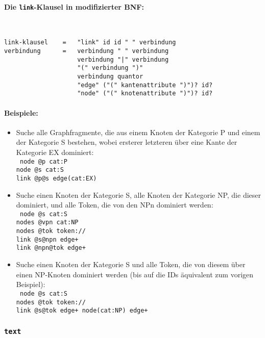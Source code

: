 \documentclass[12pt]{scrartcl}
\begin{document}
\paragraph*{Die \texttt{link}-Klausel in modifizierter BNF:}
~
\begin{framed}
\begin{lstlisting}
link-klausel    =   "link" id id " " verbindung
verbindung      =   verbindung " " verbindung
                    verbindung "|" verbindung
                    "(" verbindung ")"
                    verbindung quantor
                    "edge" ("(" kantenattribute ")")? id?
                    "node" ("(" knotenattribute ")")? id?
\end{lstlisting}
\end{framed}


\paragraph*{Beispiele:}
\begin{itemize}
	\item Suche alle Graphfragmente, die aus einem Knoten der Kategorie P und einem der Kategorie S bestehen, wobei ersterer letzteren über eine Kante der Kategorie EX dominiert:\\
	{\tt
	node @p cat:P\\[-.4ex]
	node @s cat:S\\[-.4ex]
	link @p@s edge(cat:EX)
	}
	\item Suche einen Knoten der Kategorie S, alle Knoten der Kategorie NP, die dieser dominiert, und alle Token, die von den NPn dominiert werden:\\
	{\tt
	node @s cat:S\\[-.4ex]
	nodes @vpn cat:NP\\[-.4ex]
	nodes @tok token://\\[-.4ex]
	link @s@npn edge+\\[-.4ex]
	link @npn@tok edge+
	}
	\item Suche einen Knoten der Kategorie S und alle Token, die von diesem über einen NP-Knoten dominiert werden (bis auf die IDs äquivalent zum vorigen Beispiel):\\
	{\tt
	node @s cat:S\\[-.4ex]
	nodes @tok token://\\[-.4ex]
	link @s@tok edge+ node(cat:NP) edge+
	}
\end{itemize}




\subsubsection{\texttt{text}}
\end{document}
